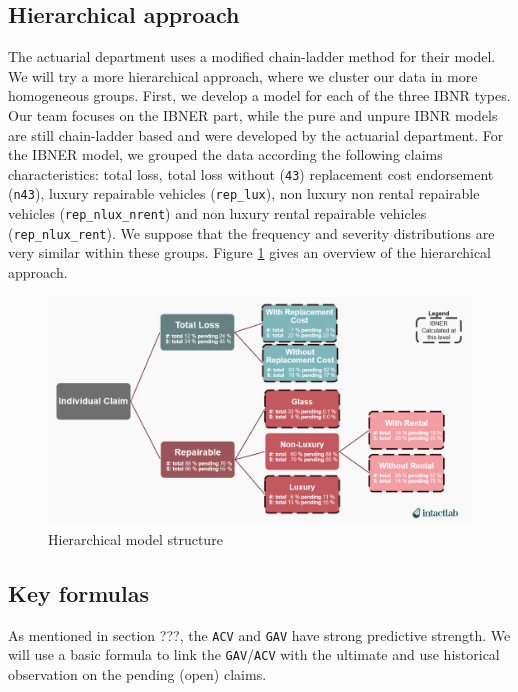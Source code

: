 \subsection{Hierarchical approach}
	The actuarial department uses a modified chain-ladder method for their model. We will try a more hierarchical approach, where we cluster our data in more homogeneous groups. First, we develop a model for each of the three IBNR types. Our team focuses on the IBNER part, while the pure and unpure IBNR models are still chain-ladder based and were developed by the actuarial department. For the IBNER model, we grouped the data according the following claims characteristics:  total loss, total loss without (\texttt{43}) replacement cost endorsement (\texttt{n43}), luxury repairable vehicles (\texttt{rep\_lux}), non luxury non rental repairable vehicles (\texttt{rep\_nlux\_nrent}) and non luxury rental repairable vehicles (\texttt{rep\_nlux\_rent}). We suppose that the frequency and severity distributions are very similar within these groups. Figure \ref{Fig_hier_model} gives an overview of the hierarchical approach.
	\begin{figure}[H]
		\begin{center}
			\includegraphics[scale=0.4]{Graphiques/Hier_model} 
			\renewcommand{\figurename}{Figure}
			\caption{Hierarchical model structure}\label{Fig_hier_model}
		\end{center}
	\end{figure}
 
\subsection{Key formulas}
	As mentioned in section ???, the \texttt{ACV} and \texttt{GAV} have strong predictive strength. We will use a basic formula to link the \texttt{GAV}/\texttt{ACV} with the ultimate and use historical observation on the pending (open) claims.

